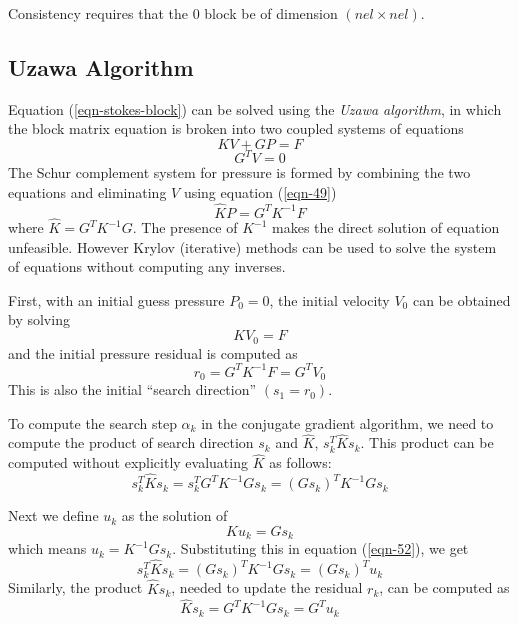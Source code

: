 \documentclass[10pt,letterpaper]{article}
\begin{document}
Consistency requires that the 0 block be of dimension $(nel\times nel)$.

\subsection{Uzawa Algorithm}
Equation (\ref{eqn-stokes-block}) can be solved using the \textit{Uzawa 
algorithm}, in which the block matrix equation is broken into two coupled
systems of equations
\begin{equation}\label{eqn-48}
KV + GP = F
\end{equation}
\begin{equation}\label{eqn-49}
G^TV = 0
\end{equation}
The Schur complement system for pressure is formed by combining the two
equations and eliminating $V$ using equation (\ref{eqn-49})
\begin{equation}\label{eqn-50}
\hat{K}P=G^TK^{-1}F
\end{equation}
where $\hat{K}=G^TK^{-1}G$. The presence of $K^{-1}$ makes the direct
solution of equation unfeasible. However Krylov (iterative) methods can be
used to solve the system of equations without computing any inverses.

First, with an initial guess pressure $P_0=0$, the initial velocity $V_0$
can be obtained by solving
\begin{equation}\label{eqn-51}
KV_0=F
\end{equation}
and the initial pressure residual is computed as
\begin{equation}\label{eqn-r0}
r_0=G^TK^{-1}F=G^TV_0
\end{equation}
This is also the initial ``search direction'' $(s_1=r_0)$. 

To compute the search step $\alpha_k$ in the conjugate gradient algorithm,
we need to compute the product of search direction $s_k$ and $\hat{K}$,
$s_k^T\hat{K}s_k$. This product can be computed without explicitly evaluating
$\hat{K}$ as follows:
\begin{equation}\label{eqn-52}
s_k^T\hat{K}s_k=s_k^TG^TK^{-1}Gs_k=(Gs_k)^TK^{-1}Gs_k
\end{equation}

Next we define $u_k$ as the solution of
\begin{equation}\label{eqn-53}
Ku_k=Gs_k
\end{equation}
which means $u_k=K^{-1}Gs_k$. Substituting this in equation (\ref{eqn-52}),
we get
\begin{equation}\label{eqn-54}
s_k^T\hat{K}s_k=(Gs_k)^TK^{-1}Gs_k=(Gs_k)^Tu_k
\end{equation}
Similarly, the product $\hat{K}s_k$, needed to update the residual $r_k$,
can be computed as
\begin{equation}\label{eqn-54prime}
\hat{K}s_k=G^TK^{-1}Gs_k=G^Tu_k
\end{equation}
\end{document}
